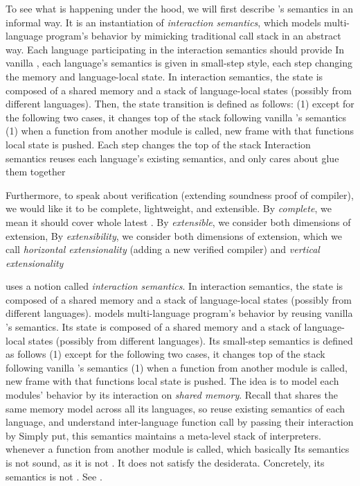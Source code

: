 {To see what is happening under the hood, we will first describe \ccc{}'s semantics in an informal way.
It is an instantiation of \textit{interaction semantics}, which models multi-language program's behavior by mimicking traditional call stack in an abstract way.
Each language participating in the interaction semantics should provide
In vanilla \cc{}, each language's semantics is given in small-step style, each step changing the memory and language-local state.
In interaction semantics, the state is composed of a shared memory and a stack of language-local states (possibly from different languages).
Then, the state transition is defined as follows:
(1) except for the following two cases, it changes top of the stack following vanilla \cc{}'s semantics
(1) when a function from another module is called, new frame with that functions local state is pushed.
Each step changes the top of the stack
Interaction semantics reuses each language's existing semantics, and only cares about glue them together





Furthermore, to speak about verification (extending soundness proof of compiler), we would like it to be complete, lightweight, and extensible.
By \textit{complete}, we mean it should cover whole latest \cc{}.
By \textit{extensible}, we consider both dimensions of extension,
By \textit{extensibility}, we consider both dimensions of extension,
which we call \textit{horizontal extensionality} (adding a new verified compiler)
and \textit{vertical extensionality}


\ccc{} uses a notion called \textit{interaction semantics}.
In interaction semantics, the state is composed of a shared memory and a stack of language-local states (possibly from different languages).
models multi-language program's behavior by reusing vanilla \cc{}'s semantics.
Its state is composed of a shared memory and a stack of language-local states (possibly from different languages).
Its small-step semantics is defined as follows
(1) except for the following two cases, it changes top of the stack following vanilla \cc{}'s semantics
(1) when a function from another module is called, new frame with that functions local state is pushed.
The idea is to model each modules' behavior by its interaction on \textit{shared memory}.
Recall that \cc{} shares the same memory model across all its languages, so
reuse existing semantics of each language, and understand inter-language function call by passing their interaction by
Simply put, this semantics maintains a meta-level stack of interpreters.
whenever a function from another module is called,
which basically
Its semantics is not sound, as it is not \lbound{}.
It does not satisfy the desiderata.
Concretely, its semantics is not \lbound{}.
See .




}
